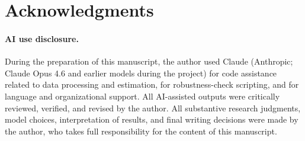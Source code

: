 \documentclass[12pt,a4paper]{article}
\begin{document}
\vspace{1em}

\section*{Acknowledgments}

\paragraph{AI use disclosure.}
During the preparation of this manuscript, the author used Claude (Anthropic; Claude Opus 4.6 and earlier models during the project) for code assistance related to data processing and estimation, for robustness-check scripting, and for language and organizational support. All AI-assisted outputs were critically reviewed, verified, and revised by the author. All substantive research judgments, model choices, interpretation of results, and final writing decisions were made by the author, who takes full responsibility for the content of this manuscript.

\newpage
\end{document}
